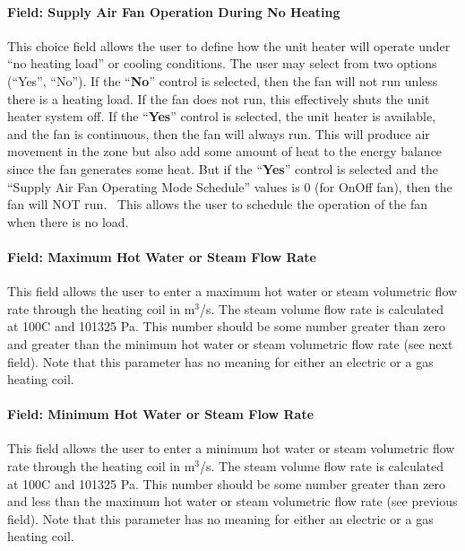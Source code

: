 \paragraph{Field: Supply Air Fan Operation During No Heating}\label{field-supply-air-fan-operation-during-no-heating}

This choice field allows the user to define how the unit heater will operate under ``no heating load'' or cooling conditions. The user may select from two options (``Yes'', ``No''). If the ``\textbf{No}'' control is selected, then the fan will not run unless there is a heating load. If the fan does not run, this effectively shuts the unit heater system off. If the ``\textbf{Yes}'' control is selected, the unit heater is available, and the fan is continuous, then the fan will always run. This will produce air movement in the zone but also add some amount of heat to the energy balance since the fan generates some heat. But if the ``\textbf{Yes}'' control is selected and the ``Supply Air Fan Operating Mode Schedule'' values is 0 (for OnOff fan), then the fan will NOT run.~ This allows the user to schedule the operation of the fan when there is no load.

\paragraph{Field: Maximum Hot Water or Steam Flow Rate}\label{field-maximum-hot-water-or-steam-flow-rate-000}

This field allows the user to enter a maximum hot water or steam volumetric flow rate through the heating coil in m\(^{3}\)/s. The steam volume flow rate is calculated at 100C and 101325 Pa. This number should be some number greater than zero and greater than the minimum hot water or steam volumetric flow rate (see next field). Note that this parameter has no meaning for either an electric or a gas heating coil.

\paragraph{Field: Minimum Hot Water or Steam Flow Rate}\label{field-minimum-hot-water-or-steam-flow-rate-000}

This field allows the user to enter a minimum hot water or steam volumetric flow rate through the heating coil in m\(^{3}\)/s. The steam volume flow rate is calculated at 100C and 101325 Pa. This number should be some number greater than zero and less than the maximum hot water or steam volumetric flow rate (see previous field). Note that this parameter has no meaning for either an electric or a gas heating coil.

